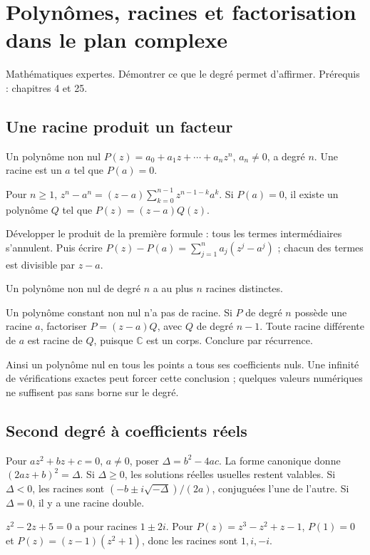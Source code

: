 \documentclass[../cours_tle.tex]{subfiles}
\begin{document}
\setcounter{chapter}{26}
\chapter{Polynômes, racines et factorisation dans le plan complexe}
\label{ch:27}
\begin{objectif}
Mathématiques expertes. Démontrer ce que le degré permet d'affirmer. Prérequis : chapitres 4 et 25.
\end{objectif}
\section{Une racine produit un facteur}
Un polynôme non nul $P(z)=a_0+a_1z+\cdots+a_nz^n$, $a_n\ne0$, a degré $n$. Une racine est un $a$ tel que $P(a)=0$.
\begin{propriete}
Pour $n\ge1$,
$z^n-a^n=(z-a)\sum_{k=0}^{n-1}z^{n-1-k}a^k$.
Si $P(a)=0$, il existe un polynôme $Q$ tel que $P(z)=(z-a)Q(z)$.
\end{propriete}
\begin{demonstration}
Développer le produit de la première formule : tous les termes intermédiaires s'annulent.
Puis écrire $P(z)-P(a)=\sum_{j=1}^n a_j(z^j-a^j)$ ; chacun des termes est divisible par $z-a$.
\end{demonstration}
\begin{theoreme}
Un polynôme non nul de degré $n$ a au plus $n$ racines distinctes.
\end{theoreme}
\begin{demonstration}
Un polynôme constant non nul n'a pas de racine. Si $P$ de degré $n$ possède une racine $a$, factoriser $P=(z-a)Q$, avec $Q$ de degré $n-1$. Toute racine différente de $a$ est racine de $Q$, puisque $\mathbb C$ est un corps. Conclure par récurrence.
\end{demonstration}
Ainsi un polynôme nul en tous les points a tous ses coefficients nuls. Une infinité de vérifications exactes peut forcer cette conclusion ; quelques valeurs numériques ne suffisent pas sans borne sur le degré.
\section{Second degré à coefficients réels}
Pour $az^2+bz+c=0$, $a\ne0$, poser $\Delta=b^2-4ac$.
La forme canonique donne $(2az+b)^2=\Delta$.
Si $\Delta\ge0$, les solutions réelles usuelles restent valables. Si $\Delta<0$, les racines sont
$(-b\pm i\sqrt{-\Delta})/(2a)$, conjuguées l'une de l'autre.
Si $\Delta=0$, il y a une racine double.
\begin{exemple}
$z^2-2z+5=0$ a pour racines $1\pm2i$.
Pour $P(z)=z^3-z^2+z-1$, $P(1)=0$ et
$P(z)=(z-1)(z^2+1)$, donc les racines sont $1,i,-i$.
\end{exemple}
\end{document}
